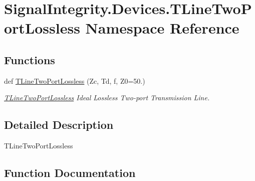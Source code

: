\hypertarget{namespaceSignalIntegrity_1_1Devices_1_1TLineTwoPortLossless}{}\section{Signal\+Integrity.\+Devices.\+T\+Line\+Two\+Port\+Lossless Namespace Reference}
\label{namespaceSignalIntegrity_1_1Devices_1_1TLineTwoPortLossless}
\subsection*{Functions}
\begin{DoxyCompactItemize}
\item 
def \hyperlink{namespaceSignalIntegrity_1_1Devices_1_1TLineTwoPortLossless_ae60e5500381a4628f39aced085fadf73}{T\+Line\+Two\+Port\+Lossless} (Zc, Td, f, Z0=50.)
\begin{DoxyCompactList}\small\item\em \hyperlink{namespaceSignalIntegrity_1_1Devices_1_1TLineTwoPortLossless}{T\+Line\+Two\+Port\+Lossless} Ideal Lossless Two-\/port Transmission Line. \end{DoxyCompactList}\end{DoxyCompactItemize}


\subsection{Detailed Description}
\begin{DoxyVerb}TLineTwoPortLossless\end{DoxyVerb}
 

\subsection{Function Documentation}
\mbox{\label{namespaceSignalIntegrity_1_1Devices_1_1TLineTwoPortLossless_ae60e5500381a4628f39aced085fadf73}} 
